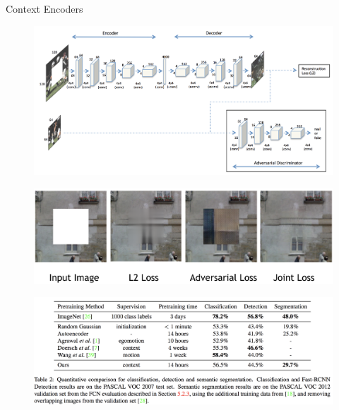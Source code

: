 \begin{frame}[allowframebreaks]{Context Encoders}
    \framebreak

    \begin{figure}
        \flushleft
        \includegraphics[width=1\linewidth,height=\textheight,keepaspectratio]{images/ssl/slide_21_1_img.png}
    \end{figure}

    \framebreak

    \begin{figure}
        \flushleft
        \includegraphics[width=1\linewidth,height=\textheight,keepaspectratio]{images/ssl/slide_22_1_img.png}
    \end{figure}

    \framebreak

    \begin{figure}
        \flushleft
        \includegraphics[width=1\linewidth,height=\textheight,keepaspectratio]{images/ssl/slide_23_1_img.png}
    \end{figure}


\end{frame}
